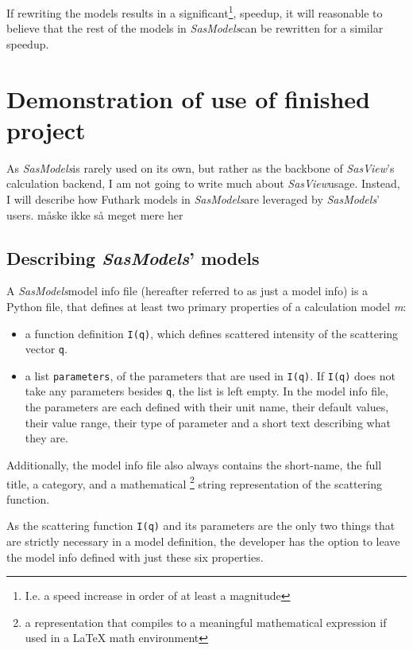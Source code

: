 \documentclass[11pt]{article}
\newcommand{\sasmodels}{\textit{SasModels}}
\newcommand{\sasview}{\textit{SasView}}
\begin{document}
If rewriting the models results in a significant\footnote{I.e. a speed increase
  in order of at least a magnitude}, speedup, it will reasonable to believe that 
  the rest of the models in \sasmodels can be rewritten for a similar
  speedup.

\section{Demonstration of use of finished project}
As \sasmodels is rarely used on its own, but rather as the backbone of 
\sasview's calculation backend, I am not going to write much about 
\sasview usage.
Instead, I will describe how Futhark models in \sasmodels are leveraged 
by \sasmodels' users.
måske ikke så meget mere her


\subsection{Describing \sasmodels' models}
A \sasmodels model info file (hereafter referred to as just a model info) is a 
Python file, that defines at least two primary properties of a 
calculation model \textit{m}:
\begin{itemize}

  \item a function definition \texttt{I(q)}, which defines scattered intensity 
  of the scattering vector \texttt{q}.

  \item a list \texttt{parameters}, of the parameters that are used in 
  \texttt{I(q)}. If \texttt{I(q)} does not take any parameters besides 
  \texttt{q}, the list is left empty.
  In the model info file, the parameters are each defined with their unit name, 
  their default values, their value range, their type of parameter and
  a short text describing what they are.
\end{itemize}

Additionally, the model info file also always contains the short-name, 
the full title, a category, and a mathematical \footnote{a representation 
that compiles to a meaningful mathematical expression if used in a LaTeX math 
environment} string representation of the scattering function.

As the scattering function \texttt{I(q)} and its parameters are the only 
two things that are strictly necessary in a model definition, the developer
has the option to leave the model info defined with just these six properties.
\end{document}
